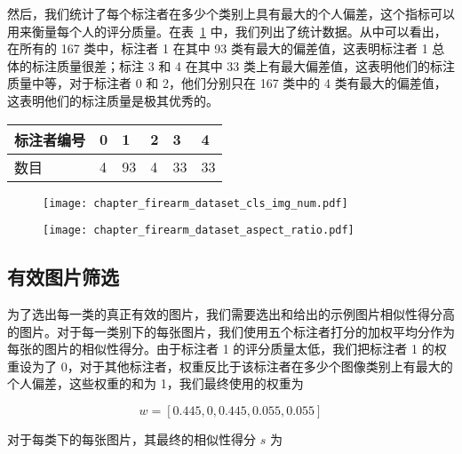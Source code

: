 然后，我们统计了每个标注者在多少个类别上具有最大的个人偏差，这个指标可以用来衡量每个人的评分质量。在表~\ref{table:largest_devi_num} 中，我们列出了统计数据。从中可以看出，在所有的 167 类中，标注者 1 在其中 93 类有最大的偏差值，这表明标注者 1 总体的标注质量很差；标注 3 和 4 在其中 33 类上有最大偏差值，这表明他们的标注质量中等，对于标注者 0 和 2，他们分别只在 167 类中的 4 类有最大的偏差值，这表明他们的标注质量是极其优秀的。
\begin{table}[h]
	\centering
	\begin{tabular}{@{}llllll@{}}
		\toprule
		标注者编号	    &  0		& 1 & 2 & 3 & 4  \\
		\midrule
		数目 &  4 & 93 & 4 & 33 & 33 \\
		\bottomrule
	\end{tabular}
	\label{table:largest_devi_num}
\end{table}

\begin{figure}[!t]
	\centering
	\texttt{[image: chapter\_firearm\_dataset\_cls\_img\_num.pdf]}
	\label{fig:dataset_cls_img_num}
\end{figure}

\begin{figure}[!t]
	\centering
	\texttt{[image: chapter\_firearm\_dataset\_aspect\_ratio.pdf]}
	\label{fig:dataset_aspect_ratio}
\end{figure}

\subsection{有效图片筛选}
为了选出每一类的真正有效的图片，我们需要选出和给出的示例图片相似性得分高的图片。对于每一类别下的每张图片，我们使用五个标注者打分的加权平均分作为每张的图片的相似性得分。由于标注者 1 的评分质量太低，我们把标注者 1 的权重设为了 0，对于其他标注者，权重反比于该标注者在多少个图像类别上有最大的个人偏差，这些权重的和为 1，我们最终使用的权重为

 \[w = [0.445, 0, 0.445, 0.055, 0.055]\]

对于每类下的每张图片，其最终的相似性得分 $s$ 为

